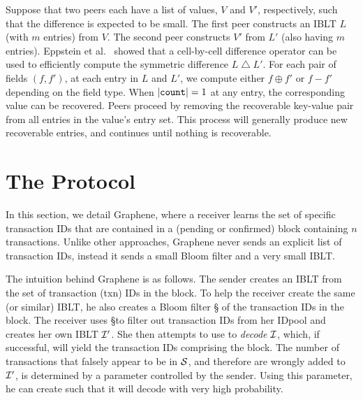 Suppose that two peers each have a list of values, $V$ and $V'$,
respectively, such that the difference is expected to be small.  The
first peer constructs an IBLT $L$ (with $m$ entries) from $V$.  The
second peer constructs $V'$ from $L'$ (also having $m$ entries).
Eppstein et al.~\cite{eppstein:2011} showed that a cell-by-cell
difference operator can be used to efficiently compute the symmetric
difference $L \bigtriangleup L'$.  For each pair of fields $(f, f')$,
at each entry in $L$ and $L'$, we compute either $f \oplus f'$ or
\mbox{$f - f'$} depending on the field type.  When
$|\mbox{\texttt{count}}| = 1$ at any entry, the corresponding
value can be recovered.  
  Peers proceed by removing the recoverable key-value pair from all entries in the value's entry set.
This process will generally produce new recoverable entries, and
continues until nothing is recoverable.
 
\section{The Protocol}

In this section, we detail Graphene,
where a receiver 
learns the set of specific transaction IDs that are contained in a
(pending or confirmed) block containing $n$ transactions. Unlike other approaches, Graphene never  sends an explicit list of transaction IDs, instead it sends  a small Bloom filter and a very small IBLT.  



The intuition behind Graphene is as follows. The sender creates an IBLT \I
from the set of transaction (txn) IDs in the block. To help the receiver
create the same (or similar) IBLT, he also creates a Bloom filter \S
 of the transaction IDs in the block. The receiver uses \S to filter out
transaction IDs from her IDpool %
and creates her own IBLT $\cal{I}'$. She then attempts to use \Ip to \emph{decode} $\cal{I}$, which, if successful, will yield
the transaction IDs comprising the block. The number of transactions
that falsely appear to be in $\cal{S}$, and therefore are wrongly added to
$\cal{I}'$, is determined by a parameter controlled by the sender. Using
this parameter, he can
create \I such that it will decode with very high probability.  

